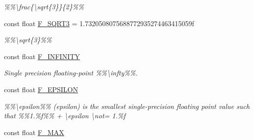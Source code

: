 \begin{DoxyCompactItemize}
\begin{DoxyCompactList}\small\item\em \%\%\textbackslash{}frac\{\textbackslash{}sqrt\{3\}\}\{2\}\%\% \end{DoxyCompactList}\item 
\hypertarget{group___scalar_math_consts_ga1e7def1903a3d92805ba4ed841ee1bbf}{}const float \hyperlink{group___scalar_math_consts_ga1e7def1903a3d92805ba4ed841ee1bbf}{F\+\_\+\+S\+Q\+R\+T3} = 1.\+7320508075688772935274463415059f\label{group___scalar_math_consts_ga1e7def1903a3d92805ba4ed841ee1bbf}

\begin{DoxyCompactList}\small\item\em \%\%\textbackslash{}sqrt\{3\}\%\% \end{DoxyCompactList}\item 
const float \hyperlink{group___scalar_math_consts_gaa4b8aaaeaf14dfc8a07938655564fcf7}{F\+\_\+\+I\+N\+F\+I\+N\+I\+T\+Y}
\begin{DoxyCompactList}\small\item\em Single precision floating-\/point \%\%\textbackslash{}infty\%\%. \end{DoxyCompactList}\item 
\hypertarget{group___scalar_math_consts_gac554360386eb65fd9657715e0b12d7d7}{}const float \hyperlink{group___scalar_math_consts_gac554360386eb65fd9657715e0b12d7d7}{F\+\_\+\+E\+P\+S\+I\+L\+O\+N}\label{group___scalar_math_consts_gac554360386eb65fd9657715e0b12d7d7}

\begin{DoxyCompactList}\small\item\em \%\%\textbackslash{}epsilon\%\% (epsilon) is the smallest single-\/precision floating point value such that \%\%1.\%f\%\% + \textbackslash{}epsilon \textbackslash{}not= 1.\%f \end{DoxyCompactList}\item 
\hypertarget{group___scalar_math_consts_ga0dea70f1a79ea8a5421e1325ef785d20}{}const float \hyperlink{group___scalar_math_consts_ga0dea70f1a79ea8a5421e1325ef785d20}{F\+\_\+\+M\+A\+X}\label{group___scalar_math_consts_ga0dea70f1a79ea8a5421e1325ef785d20}


\end{DoxyCompactItemize}
